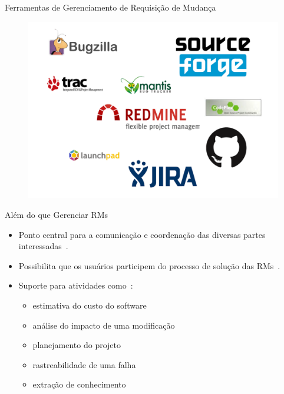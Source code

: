 \documentclass[t,14pt,mathserif]{beamer}
\begin{document}
\begin{frame}{Ferramentas de Gerenciamento de Requisição de Mudança}
		\begin{figure}[hbtp]
			\centering
			\includegraphics[scale=.3]{../img/issue-tracking-sytem.png}
		\end{figure}
\end{frame}

\begin{frame}{Além do que Gerenciar RMs}
	\begin{itemize}
        \item Ponto central para a comunicação e coordenação das diversas partes
              interessadas~\cite{Bertram:2010:CCB:1718918.1718972}.
        \item Possibilita que os usuários participem do processo de solução das
              RMs~\cite{Breu:2010:INB:1718918.1718973}.
        \item Suporte para atividades como~\cite{cavalcanti2013bug}:
            \begin{itemize}
                \item estimativa do custo do software
                \item análise do impacto de uma modificação
                \item planejamento do projeto
                \item rastreabilidade de uma falha
                \item extração de conhecimento
            \end{itemize}
      \end{itemize}
\end{frame}
\end{document}

